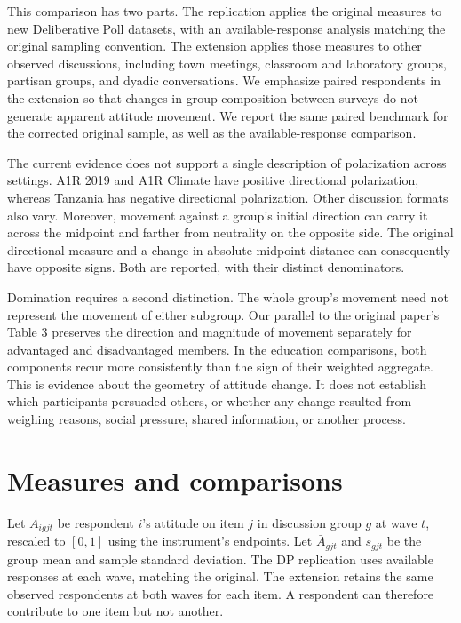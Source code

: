 \documentclass[11pt]{article}
\begin{document}
This comparison has two parts. The replication applies the original measures to
new Deliberative Poll datasets, with an available-response analysis matching the
original sampling convention. The extension applies those measures to other
observed discussions, including town meetings, classroom and laboratory groups,
partisan groups, and dyadic conversations. We emphasize paired respondents in
the extension so that changes in group composition between surveys do not generate
apparent attitude movement. We report the same paired benchmark for the corrected
original sample, as well as the available-response comparison.

The current evidence does not support a single description of polarization across
settings. A1R 2019 and A1R Climate have positive directional polarization, whereas
Tanzania has negative directional polarization. Other discussion formats also vary.
Moreover, movement against a group's initial direction can carry it across the
midpoint and farther from neutrality on the opposite side. The original directional
measure and a change in absolute midpoint distance can consequently have opposite
signs. Both are reported, with their distinct denominators.

Domination requires a second distinction. The whole group's movement need not
represent the movement of either subgroup. Our parallel to the original paper's
Table 3 preserves the direction and magnitude of movement separately for advantaged
and disadvantaged members. In the education comparisons, both components recur
more consistently than the sign of their weighted aggregate. This is evidence
about the geometry of attitude change. It does not establish which participants
persuaded others, or whether any change resulted from weighing reasons, social
pressure, shared information, or another process.

\section{Measures and comparisons}
Let $A_{igjt}$ be respondent $i$'s attitude on item $j$ in discussion group $g$
at wave $t$, rescaled to $[0,1]$ using the instrument's endpoints. Let
$\bar A_{gjt}$ and $s_{gjt}$ be the group mean and sample standard deviation.
The DP replication uses available responses at each wave, matching the original.
The extension retains the same observed respondents at both waves for each item. A respondent can therefore contribute to one item but not another.
\end{document}
